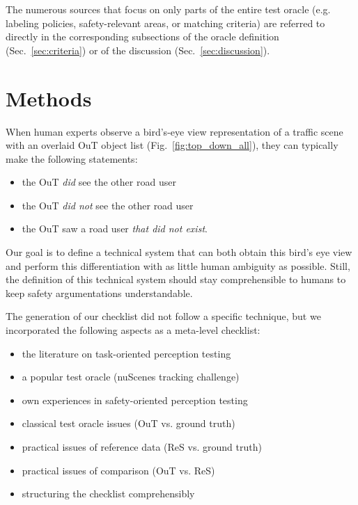 \documentclass[conference]{IEEEtran}
\begin{document}
The numerous sources that focus on only parts of the entire test oracle (e.g. labeling policies, safety-relevant areas, or matching criteria) are referred to directly in the corresponding subsections of the oracle definition (Sec.~\ref{sec:criteria}) or of the discussion (Sec.~\ref{sec:discussion}).




\section{Methods}
\label{sec:method}


When human experts observe a bird's-eye view representation of a traffic scene with an overlaid OuT object list (Fig.~\ref{fig:top_down_all}), they can typically make the following statements:
\begin{itemize}
	\item the OuT \textit{did} see the other road user
	\item the OuT \textit{did not} see the other road user 
	\item the OuT saw a road user \textit{that did not exist}.
\end{itemize}

Our goal is to define a technical system that can both obtain this bird's eye view and perform this differentiation with as little human ambiguity as possible.
Still, the definition of this technical system should stay comprehensible to humans to keep safety argumentations understandable.

The generation of our checklist did not follow a specific technique, but we incorporated the following aspects as a meta-level checklist:
\begin{itemize}
\item the literature on task-oriented perception testing
\item a popular test oracle (nuScenes tracking challenge)
\item own experiences in safety-oriented perception testing
\item classical test oracle issues (OuT vs. ground truth)
\item practical issues of reference data (ReS vs. ground truth)
\item practical issues of comparison (OuT vs. ReS)
\item structuring the checklist comprehensibly
\end{itemize}
\end{document}
